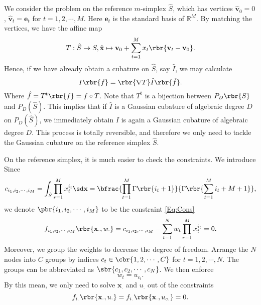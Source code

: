 \documentclass[english, nochinese]{pnote}
\begin{document}
We consider the problem on the reference $m$-simplex $\hat{S}$, which has vertices $ \hat{\mathbf{v}}_0 = 0 $, $ \hat{\mathbf{v}}_t = \mathbf{e}_t $ for $ t = 1, 2, \cdots, M $. Here $\mathbf{e}_t$ is the standard basis of $\mathbb{R}^M$. By matching the vertices, we have the affine map
\begin{equation}
T : \hat{S} \rightarrow S, \hat{\mathbf{x}} \mapsto \mathbf{v}_0 + \sum_{ t = 1 }^M x_t \rbr{ \mathbf{v}_t - \mathbf{v}_0 }.
\end{equation}
Hence, if we have already obtain a cubature on $\hat{S}$, say $\hat{I}$, we may calculate
\begin{equation}
I \rbr{f} = \rbr{ \nabla T } \hat{I} \rbr{\hat{f}}.
\end{equation}
Where $ \hat{f} = T^{\text{t}} \rbr{f} = f \circ T $. Note that $T^{\text{t}}$ is a bijection between $ P_D \rbr{S} $ and $ P_D (\hat{S}) $. This implies that if $\hat{I}$ is a Gaussian cubature of algebraic degree $D$ on $ P_D (\hat{S}) $, we immediately obtain $I$ is again a Gaussian cubature of algebraic degree $D$. This process is totally reversible, and therefore we only need to tackle the Gaussian cubature on the reference simplex $\hat{S}$.

On the reference simplex, it is much easier to check the constraints. We introduce 
Since
\begin{equation}
c_{ i_1, i_2, \cdots, i_M } = \int_{\hat{S}} \prod_{ r = 1 }^M x_t^{i_t} \sd \mathbf{x} = \bfrac{ \prod_{ t = 1 }^M \Gamma \rbr{ i_t + 1 } }{ \Gamma \rbr{ \sum_{ t = 1 }^M i_t + M + 1 } },
\end{equation}
we denote $ \pbr{ i_1, i_2, \cdots, i_M } $ to be the constraint \eqref{Eq:Cons}
\begin{equation}
f_{ i_1, i_2, \cdots, i_M } \rbr{ \mathbf{x}_{\cdot}, w_{\cdot} } = c_{ i_1, i_2, \cdots, i_M } - \sum_{ t = 1 }^N w_t \prod_{ r = 1 }^M x_t^{i_t} = 0.
\end{equation}
Moreover, we group the weights to decrease the degree of freedom. Arrange the $N$ nodes into $C$ groups by indices $ c_t \in \cbr{ 1, 2, \cdots, C } $ for $ t = 1, 2, \cdots, N $. The groups can be abbreviated as $ \sbr{ c_1, c_2, \cdots, c_N } $. We then enforce
\begin{equation}
w_t = u_{c_t}.
\end{equation}
By this mean, we only need to solve $\mathbf{x}_{\cdot}$ and $u_{\cdot}$ out of the constraints
\begin{equation}
f_{i_{\cdot}} \rbr{ \mathbf{x}_{\cdot}, u_{\cdot} } = f_{i_{\cdot}} \rbr{ \mathbf{x}_{\cdot}, u_{c_{\cdot}} } = 0.
\end{equation}
\end{document}
